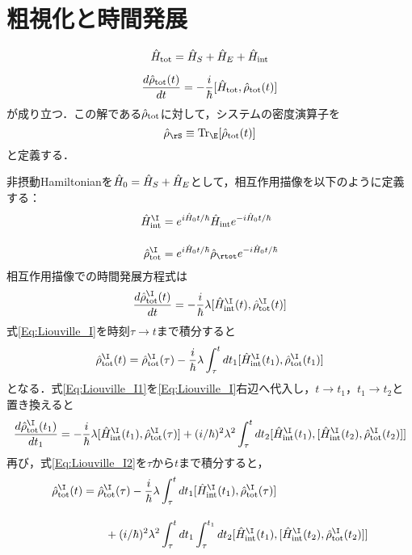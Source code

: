 \section{粗視化と時間発展}
\begin{equation}
    {\hat{H}}_{\mathrm{tot}}={\hat{H}}_{S}+{\hat{H}}_{E}+{\hat{H}}_{\mathrm{int}}
\end{equation}

\begin{equation}
    \frac{d{\hat{\rho}}_{\mathrm{tot}}(t)}{dt}
    =-\frac{i}{\hbar}[{\hat{H}}_{\mathrm{tot}},{\hat{\rho}}_{\mathrm{tot}}(t)]
\end{equation}
が成り立つ．この解である${\hat{\rho}}_{\mathrm{tot}}$に対して，システムの密度演算子を
\begin{equation}
    \hrho_{\rS}\equiv\tr_{\E}[\hrho_{\tot}(t)]
\end{equation}
と定義する．

非摂動Hamiltonianを${\hat{H}}_0={\hat{H}}_{S}+{\hat{H}}_{E}$として，相互作用描像を以下のように定義する：
\begin{align}
    \hH^{\I}_{\rint}&=e^{i\hH_0 t/\hbar}\hH_{\rint}e^{-i\hH_0 t/\hbar}\\[10pt]
    \hrho^{\I}_{\tot}&=e^{i\hH_0 t/\hbar}\hrho_{\rtot}e^{-i\hH_0 t/ \hbar}
\end{align}
相互作用描像での時間発展方程式は
\begin{equation}\label{Eq:Liouville_I}
    \frac{d\hrho^{\I}_{\tot}(t)}{dt}
    =-\frac{i}{\hbar}\lambda[\hH^{\I}_{\rint}(t),\hrho^{\I}_{\tot}(t)]
\end{equation}
式\eqref{Eq:Liouville_I}を時刻$\tau\to t$まで積分すると
\begin{equation}\label{Eq:Liouville_I1}
    \hrho^{\I}_{\tot}(t)
    =\hrho^{\I}_{\tot}(\tau)-\frac{i}{\hbar}\lambda\int_{\tau}^{t}dt_1[\hH^{\I}_{\rint}(t_1),\hrho^{\I}_{\tot}(t_1)]
\end{equation}
となる．式\eqref{Eq:Liouville_I1}を\eqref{Eq:Liouville_I}右辺へ代入し，$t\to t_1$，$t_1\to t_2$と置き換えると
\begin{equation}\label{Eq:Liouville_I2}
    \frac{d\hrho^{\I}_{\tot}(t_1)}{dt_1}
    =-\frac{i}{\hbar}\lambda[\hH^{\I}_{\rint}(t_1),\hrho^{\I}_{\tot}(\tau)]
    +({i}/{\hbar})^2\lambda^2\int_{\tau}^{t}dt_2[\hH^{\I}_{\rint}(t_1),
    [\hH^{\I}_{\rint}(t_2),\hrho^{\I}_{\tot}(t_2)]
    ]
\end{equation}
再び，式\eqref{Eq:Liouville_I2}を$\tau$から$t$まで積分すると，
\begin{align}
    \hrho^{\I}_{\tot}(t)
    &=\hrho^{\I}_{\tot}(\tau)-\frac{i}{\hbar}\lambda
    \int_{\tau}^{t}dt_1[\hH^{\I}_{\rint}(t_1),\hrho^{\I}_{\tot}(\tau)]\nn[10pt]
    &\hspace{20pt}+({i}/{\hbar})^2\lambda^2\int_{\tau}^{t}dt_1\int_{\tau}^{t_1}dt_2[\hH^{\I}_{\rint}(t_1),
    [\hH^{\I}_{\rint}(t_2),\hrho^{\I}_{\tot}(t_2)]
    ]
\end{align}
